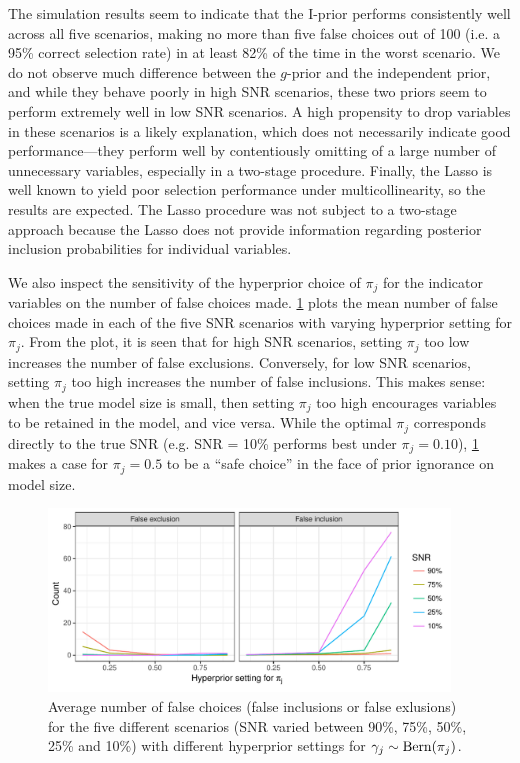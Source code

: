 \documentclass[11pt,twoside,openright]{report}
\begin{document}
\newpage
{}
The simulation results seem to indicate that the I-prior performs consistently well across all five scenarios, making no more than five false choices out of 100 (i.e. a 95\% correct selection rate) in at least 82\% of the time in the worst scenario.
We do not observe much difference between the $g$-prior and the independent prior, and while they behave poorly in high SNR scenarios, these two priors seem to perform extremely well in low SNR scenarios.
A high propensity to drop variables in these scenarios is a likely explanation, which does not necessarily indicate good performance---they perform well by contentiously omitting of a large number of unnecessary variables, especially in a two-stage procedure.
Finally, the Lasso is well known to yield poor selection performance under multicollinearity, so the results are expected.
The Lasso procedure was not subject to a two-stage approach because the Lasso does not provide information regarding posterior inclusion probabilities for individual variables.

We also inspect the sensitivity of the hyperprior choice of $\pi_j$ for the indicator variables on the number of false choices made.
\cref{fig:simres2} plots the mean number of false choices made in each of the five SNR scenarios with varying hyperprior setting for $\pi_j$.
From the plot, it is seen that for high SNR scenarios, setting $\pi_j$ too low increases the number of false exclusions.
Conversely, for low SNR scenarios, setting $\pi_j$ too high increases the number of false inclusions.
This makes sense: when the true model size is small, then setting $\pi_j$ too high encourages variables to be retained in the model, and vice versa.
While the optimal $\pi_j$ corresponds directly to the true SNR (e.g. SNR = 10\% performs best under $\pi_j=0.10$), \cref{fig:simres2} makes a case for $\pi_j=0.5$ to be a ``safe choice'' in the face of prior ignorance on model size.

\begin{figure}[hbt]
  \centering
  \includegraphics[width=0.95\textwidth]{figure/06-sens_analysis}
  \caption[Sensitivity analysis of hyperprior choice on number of false choices]{Average number of false choices (false inclusions or false exlusions) for the five different scenarios (SNR varied between 90\%, 75\%, 50\%, 25\% and 10\%) with different hyperprior settings for $\gamma_j\sim\operatorname{Bern}(\pi_j)$.}
  \label{fig:simres2}
\end{figure}
\vspace{-1em}
\end{document}
